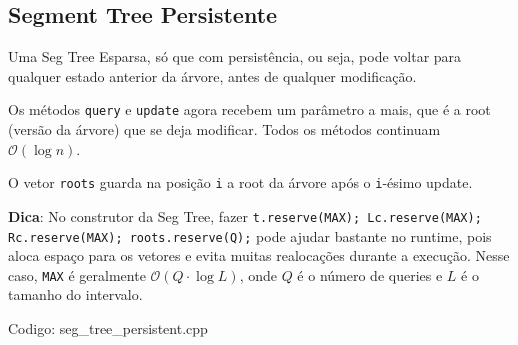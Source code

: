 \documentclass[10pt, a4paper, oneside]{book}
\begin{document}
\subsection{Segment Tree Persistente}


Uma Seg Tree Esparsa, só que com persistência, ou seja, pode voltar para qualquer estado anterior da árvore, antes de qualquer modificação.



Os métodos \texttt{query} e \texttt{update} agora recebem um parâmetro a mais, que é a root (versão da árvore) que se deja modificar. Todos os métodos continuam $\mathcal{O}(\log n)$.



O vetor \texttt{roots} guarda na posição \texttt{i} a root da árvore após o \texttt{i}-ésimo update.



\textbf{Dica}: No construtor da Seg Tree, fazer \texttt{t.reserve(MAX); Lc.reserve(MAX); Rc.reserve(MAX); roots.reserve(Q);} pode ajudar bastante no runtime, pois aloca espaço para os vetores e evita muitas realocações durante a execução. Nesse caso, \texttt{MAX} é geralmente $\mathcal{O}(Q \cdot \log L)$, onde $Q$ é o número de queries e $L$ é o tamanho do intervalo.
\hfill

Codigo: seg\_tree\_persistent.cpp
\end{document}
